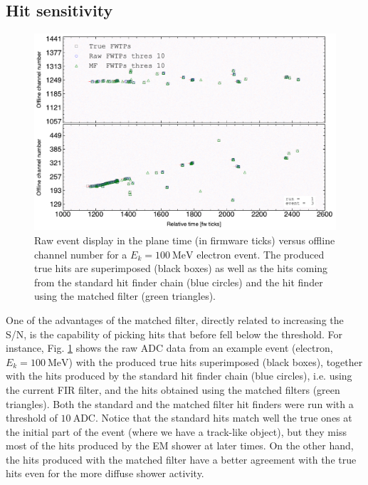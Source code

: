 \subsection{Hit sensitivity}
\label{subsec:2.5.3}

\begin{figure}
	\centering
	\includegraphics[width=0.9\linewidth]{Images/Matched_Filter/electron_k100_full_run_1_evt_3}
	\caption[Raw event display for an electron event showing the true, standard, and matched filter hits produced.]{Raw event display in the plane time (in firmware ticks) versus offline channel number for a $E_{k} = 100 \ \mathrm{MeV}$ electron event. The produced true hits are superimposed (black boxes) as well as the hits coming from the standard hit finder chain (blue circles) and the hit finder using the matched filter (green triangles).}
	\label{fig:evthitcomp}
\end{figure}

One of the advantages of the matched filter, directly related to increasing the S/N, is the capability of picking hits that before fell below the threshold. For instance, Fig. \ref{fig:evthitcomp} shows the raw ADC data from an example event (electron, $E_{k} = 100 \ \mathrm{MeV}$) with the produced true hits superimposed (black boxes), together with the hits produced by the standard hit finder chain (blue circles), i.e. using the current FIR filter, and the hits obtained using the matched filters (green triangles). Both the standard and the matched filter hit finders were run with a threshold of $10 \ \mathrm{ADC}$. Notice that the standard hits match well the true ones at the initial part of the event (where we have a track-like object), but they miss most of the hits produced by the EM shower at later times. On the other hand, the hits produced with the matched filter have a better agreement with the true hits even for the more diffuse shower activity.


